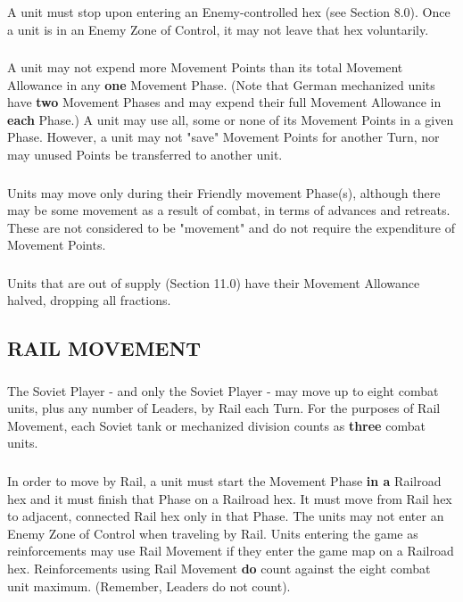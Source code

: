 \subsubsection{} A unit must stop upon entering an Enemy-controlled hex (see Section 8.0). Once a unit is in an Enemy Zone of Control, it may not leave that hex voluntarily.

\subsubsection{} A unit may not expend more Movement Points than its total Movement Allowance in any \textbf{one} Movement Phase. (Note that German mechanized units have \textbf{two} Movement Phases and may expend their full Movement Allowance in \textbf{each} Phase.) A unit may use all, some or none of its Movement Points in a given Phase. However, a unit may not "save" Movement Points for another Turn, nor may unused Points be transferred to another unit.

\subsubsection{} Units may move only during their Friendly movement Phase(s), although there may be some movement as a result of combat, in terms of advances and retreats. These are not considered to be "movement" and do not require the expenditure of Movement Points.

\subsubsection{} Units that are out of supply (Section 11.0) have their Movement Allowance halved, dropping all fractions.

\subsection{RAIL MOVEMENT}

\subsubsection{} The Soviet Player - and only the Soviet Player - may move up to eight combat units, plus any number of Leaders, by Rail each Turn. For the purposes of Rail Movement, each Soviet tank or mechanized division counts as \textbf{three} combat units.

\subsubsection{} In order to move by Rail, a unit must start the Movement Phase \textbf{in a} Railroad hex and it must finish that Phase on a Railroad hex. It must move from Rail hex to adjacent, connected Rail hex only in that Phase. The units may not enter an Enemy Zone of Control when traveling by Rail. Units entering the game as reinforcements may use Rail Movement if they enter the game map on a Railroad hex. Reinforcements using Rail Movement \textbf{do} count against the eight combat unit maximum. (Remember, Leaders do not count).

